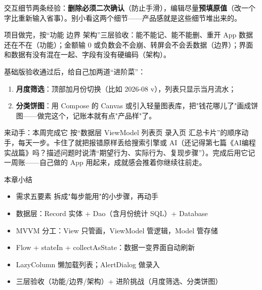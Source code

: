 交互细节两条经验：\textbf{删除必须二次确认}（防止手滑），编辑尽量\textbf{预填原值}（改一个字比重新输入省事）。别小看这两个细节——产品感就是这些细节堆出来的。


项目做完，按“功能 边界 架构”三层验收：能不能记、能不能删、重开 App 数据还在不在（功能）；金额输 0 或负数会不会崩、转屏会不会丢数据（边界）；界面和数据有没有混在一起、字段有没有硬编码（架构）。

基础版验收通过后，给自己加两道“进阶菜”：

\begin{enumerate}
  \item \textbf{月度筛选}：顶部加月份切换（比如 2026-08 v），列表只显示当月流水；
  \item \textbf{分类饼图}：用 Compose 的 Canvas 或引入轻量图表库，把"钱花哪儿了"画成饼图——做完这个，记账本就有点"产品样"了。
\end{enumerate}

\begin{tcbpractice}{来动手：本周完成它}
按“数据层 ViewModel 列表页 录入页 汇总卡片”的顺序动手，每天一步。卡住了就把报错原样丢给搜索引擎或 AI（还记得第七篇《AI编程实战篇》吗？描述问题时说清“期望行为、实际行为、复现步骤”）。完成后用它记一周账——自己做的 App 用起来，成就感会推着你继续往前走。

\end{tcbpractice}

\begin{tcbsummary}{本章小结}
\begin{itemize}
  \item 需求五要素 拆成"每步能用"的小步骤，再动手
  \item 数据层：Record 实体 + Dao（含月份统计 SQL）+ Database
  \item MVVM 分工：View 只管画，ViewModel 管逻辑，Model 管存储
  \item Flow + stateIn + collectAsState：数据一变界面自动刷新
  \item LazyColumn 懒加载列表；AlertDialog 做录入
  \item 三层验收（功能/边界/架构）+ 进阶挑战（月度筛选、分类饼图）
\end{itemize}

\end{tcbsummary}
